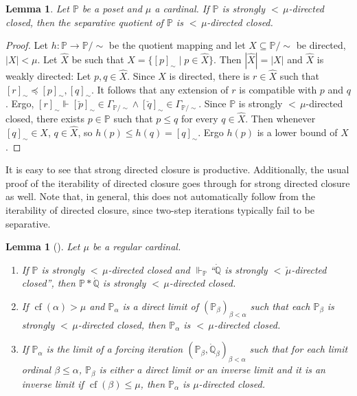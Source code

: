 \documentclass[a4paper]{amsart}
\theoremstyle{definition}
\theoremstyle{remark}
\theoremstyle{plain}
\newtheorem{mylem}[mydef]{Lemma}
\numberwithin{mydef}{section}
\DeclareMathOperator{\cf}{cf}
\newcommand{\dP}{\mathbb{P}}
\newcommand{\dQ}{\mathbb{Q}}
\begin{document}
	\begin{mylem}
		Let $\dP$ be a poset and $\mu$ a cardinal. If $\dP$ is strongly ${<}\,\mu$-directed closed, then the separative quotient of $\dP$ is ${<}\,\mu$-directed closed.
	\end{mylem}
	
	\begin{proof}
		Let $h\colon\dP\to\dP/\sim$ be the quotient mapping and let $X\subseteq\dP/\sim$ be directed, $|X|<\mu$. Let $\hat{X}$ be such that $X=\{[p]_{\sim}\;|\;p\in\hat{X}\}$. Then $|\hat{X}|=|X|$ and $\hat{X}$ is weakly directed: Let $p,q\in\hat{X}$. Since $X$ is directed, there is $r\in\hat{X}$ such that $[r]_{\sim}\preceq[p]_{\sim},[q]_{\sim}$. It follows that any extension of $r$ is compatible with $p$ and $q$. Ergo, $[r]_{\sim}\Vdash[\check{p}]_{\sim}\in\Gamma_{\dP/\sim}\wedge[\check{q}]_{\sim}\in\Gamma_{\dP/\sim}$. Since $\dP$ is strongly ${<}\,\mu$-directed closed, there exists $p\in \dP$ such that $p\leq q$ for every $q\in\hat{X}$. Then whenever $[q]_{\sim}\in X$, $q\in\hat{X}$, so $h(p)\leq h(q)=[q]_{\sim}$. Ergo $h(p)$ is a lower bound of $X$.
	\end{proof}
	
	It is easy to see that strong directed closure is productive. Additionally, the usual proof of the iterability of directed closure goes through for strong directed closure as well. Note that, in general, this does not automatically follow from the iterability of directed closure, since two-step iterations typically fail to be separative.
	
	\begin{mylem}[{\cite[Lemma 21.7]{JechSetTheory}}]\label{StrongDirIter}
		Let $\mu$ be a regular cardinal.
		\begin{enumerate}
			\item If $\dP$ is strongly ${<}\,\mu$-directed closed and $\Vdash_{\dP}$``$\dot{\dQ}$ is strongly ${<}\,\check{\mu}$-directed closed'', then $\dP*\dot{\dQ}$ is strongly ${<}\,\mu$-directed closed.
			\item If $\cf(\alpha)>\mu$ and $\dP_{\alpha}$ is a direct limit of $(\dP_{\beta})_{\beta<\alpha}$ such that each $\dP_{\beta}$ is strongly ${<}\,\mu$-directed closed, then $\dP_{\alpha}$ is ${<}\,\mu$-directed closed.
			\item If $\dP_{\alpha}$ is the limit of a forcing iteration $(\dP_{\beta},\dot{\dQ}_{\beta})_{\beta<\alpha}$ such that for each limit ordinal $\beta\leq\alpha$, $\dP_{\beta}$ is either a direct limit or an inverse limit and it is an inverse limit if $\cf(\beta)\leq\mu$, then $\dP_{\alpha}$ is $\mu$-directed closed.
		\end{enumerate}
	\end{mylem}
	
\end{document}
